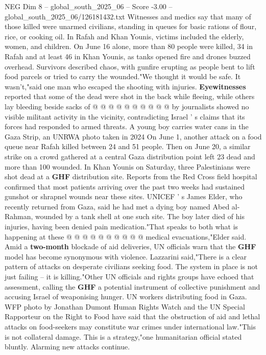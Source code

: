 \begin{textsample}{NEG Dim 8 – global\_south\_2025\_06 – Score -3.00 – global\_south\_2025\_06/126181432.txt}
Witnesses and medics say that many of those killed were unarmed civilians, standing in queues for basic rations of flour, rice, or cooking oil.
In Rafah and Khan Younis, victims included the elderly, women, and children.
On June 16 alone, more than 80 people were killed, 34 in Rafah and at least 46 in Khan Younis, as tanks opened fire and drones buzzed overhead.
Survivors described chaos, with gunfire erupting as people bent to lift food parcels or tried to carry the wounded."We thought it would be safe.
It wasn't,"said one man who escaped the shooting with injuries. \textbf{Eyewitnesses} reported that some of the dead were shot in the back while fleeing, while others lay bleeding beside sacks of @ @ @ @ @ @ @ @ @ @ by journalists showed no visible militant activity in the vicinity, contradicting Israel ' s claims that its forces had responded to armed threats.
A young boy carries water cans in the Gaza Strip, an UNRWA photo taken in 2024 On June 1, another attack on a food queue near Rafah killed between 24 and 51 people.
Then on June 20, a similar strike on a crowd gathered at a central Gaza distribution point left 23 dead and more than 100 wounded.
In Khan Younis on Saturday, three Palestinians were shot dead at a \textbf{GHF} distribution site.
Reports from the Red Cross field hospital confirmed that most patients arriving over the past two weeks had sustained gunshot or shrapnel wounds near these sites.
UNICEF ' s James Elder, who recently returned from Gaza, said he had met a dying boy named Abed al-Rahman, wounded by a tank shell at one such site.
The boy later died of his injuries, having been denied pain medication."That speaks to both what is happening at these @ @ @ @ @ @ @ @ @ @ medical evacuations,"Elder said.
Amid a \textbf{two-month} blockade of aid deliveries, UN officials warn that the \textbf{GHF} model has become synonymous with violence.
Lazzarini said,"There is a clear pattern of attacks on desperate civilians seeking food.
The system in place is not just failing -- it is killing."Other UN officials and rights groups have echoed that assessment, calling the \textbf{GHF} a potential instrument of collective punishment and accusing Israel of weaponising hunger.
UN workers distributing food in Gaza.
WFP photo by Jonathan Dumont Human Rights Watch and the UN Special Rapporteur on the Right to Food have said that the obstruction of aid and lethal attacks on food-seekers may constitute war crimes under international law."This is not collateral damage.
This is a strategy,"one humanitarian official stated bluntly.
Alarming new attacks continue.

\end{textsample}
